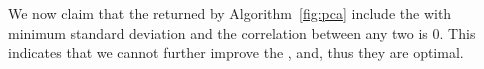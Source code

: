 
\smallskip

We now claim that the \views returned by Algorithm~\ref{fig:pca} include the
\view with minimum standard deviation and 
the correlation between any two \views 
is 0. This indicates that we cannot further improve
the \views, and, thus they are optimal.

